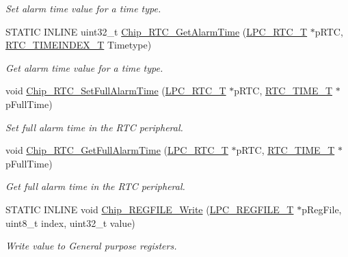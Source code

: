 \begin{DoxyCompactItemize}
\begin{DoxyCompactList}\small\item\em Set alarm time value for a time type. \end{DoxyCompactList}\item 
S\+T\+A\+T\+I\+C I\+N\+L\+I\+N\+E uint32\+\_\+t \hyperlink{group___r_t_c__17_x_x__40_x_x_gaf094ef7c4ff7295c74be8ab77e39a967}{Chip\+\_\+\+R\+T\+C\+\_\+\+Get\+Alarm\+Time} (\hyperlink{struct_l_p_c___r_t_c___t}{L\+P\+C\+\_\+\+R\+T\+C\+\_\+\+T} $\ast$p\+R\+T\+C, \hyperlink{group___r_t_c__17_x_x__40_x_x_ga8144898fe628404d396db06dc8aac0e0}{R\+T\+C\+\_\+\+T\+I\+M\+E\+I\+N\+D\+E\+X\+\_\+\+T} Timetype)
\begin{DoxyCompactList}\small\item\em Get alarm time value for a time type. \end{DoxyCompactList}\item 
void \hyperlink{group___r_t_c__17_x_x__40_x_x_ga7ad6b4d1d2aaaf093ddde0cef9023ba0}{Chip\+\_\+\+R\+T\+C\+\_\+\+Set\+Full\+Alarm\+Time} (\hyperlink{struct_l_p_c___r_t_c___t}{L\+P\+C\+\_\+\+R\+T\+C\+\_\+\+T} $\ast$p\+R\+T\+C, \hyperlink{struct_r_t_c___t_i_m_e___t}{R\+T\+C\+\_\+\+T\+I\+M\+E\+\_\+\+T} $\ast$p\+Full\+Time)
\begin{DoxyCompactList}\small\item\em Set full alarm time in the R\+T\+C peripheral. \end{DoxyCompactList}\item 
void \hyperlink{group___r_t_c__17_x_x__40_x_x_ga21b9a7c640870482b47deda15ff0a01b}{Chip\+\_\+\+R\+T\+C\+\_\+\+Get\+Full\+Alarm\+Time} (\hyperlink{struct_l_p_c___r_t_c___t}{L\+P\+C\+\_\+\+R\+T\+C\+\_\+\+T} $\ast$p\+R\+T\+C, \hyperlink{struct_r_t_c___t_i_m_e___t}{R\+T\+C\+\_\+\+T\+I\+M\+E\+\_\+\+T} $\ast$p\+Full\+Time)
\begin{DoxyCompactList}\small\item\em Get full alarm time in the R\+T\+C peripheral. \end{DoxyCompactList}\item 
S\+T\+A\+T\+I\+C I\+N\+L\+I\+N\+E void \hyperlink{group___r_t_c__17_x_x__40_x_x_ga8607152173e77715f7cc42be74799b65}{Chip\+\_\+\+R\+E\+G\+F\+I\+L\+E\+\_\+\+Write} (\hyperlink{struct_l_p_c___r_e_g_f_i_l_e___t}{L\+P\+C\+\_\+\+R\+E\+G\+F\+I\+L\+E\+\_\+\+T} $\ast$p\+Reg\+File, uint8\+\_\+t index, uint32\+\_\+t value)
\begin{DoxyCompactList}\small\item\em Write value to General purpose registers. \end{DoxyCompactList}\item 

\end{DoxyCompactItemize}
